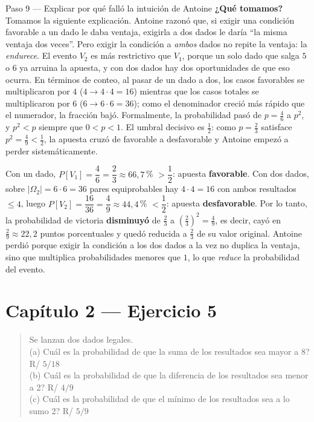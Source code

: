 \documentclass[11pt]{article}
\begin{document}
\begin{sol}
\begin{paso}{Paso 9 --- Explicar por qué falló la intuición de Antoine}
\textbf{¿Qué tomamos?} Tomamos la siguiente explicación. Antoine razonó que, si exigir una
condición favorable a un dado le daba ventaja, exigirla a dos dados le daría ``la misma ventaja
dos veces''. Pero exigir la condición a \emph{ambos} dados no repite la ventaja: la
\emph{endurece}. El evento $V_2$ es más restrictivo que $V_1$, porque un solo dado que salga $5$
o $6$ ya arruina la apuesta, y con dos dados hay dos oportunidades de que eso ocurra. En
términos de conteo, al pasar de un dado a dos, los casos favorables se multiplicaron por $4$
($4\to 4\cdot 4=16$) mientras que los casos totales se multiplicaron por $6$
($6\to 6\cdot 6=36$); como el denominador creció más rápido que el numerador, la fracción bajó.
Formalmente, la probabilidad pasó de $p=\frac46$ a $p^{2}$, y $p^{2}<p$ siempre que $0<p<1$. El
umbral decisivo es $\tfrac12$: como $p=\frac23$ satisface $p^{2}=\frac49<\frac12$, la apuesta
cruzó de favorable a desfavorable y Antoine empezó a perder sistemáticamente.
\end{paso}

\end{sol}

\begin{resp}
Con un dado, $P[V_1]=\dfrac{4}{6}=\dfrac{2}{3}\approx 66{,}7$\,\% $>\dfrac12$: apuesta
\textbf{favorable}. Con dos dados, sobre $|\Omega_2|=6\cdot 6=36$ pares equiprobables hay
$4\cdot 4=16$ con ambos resultados $\le 4$, luego
$P[V_2]=\dfrac{16}{36}=\dfrac{4}{9}\approx 44{,}4$\,\% $<\dfrac12$: apuesta \textbf{desfavorable}.
Por lo tanto, la probabilidad de victoria \textbf{disminuyó} de $\frac23$ a
$\left(\frac23\right)^{2}=\frac49$, es decir, cayó en $\frac{2}{9}\approx 22{,}2$ puntos
porcentuales y quedó reducida a $\frac23$ de su valor original. Antoine perdió porque exigir la
condición a los dos dados a la vez no duplica la ventaja, sino que multiplica probabilidades
menores que $1$, lo que \emph{reduce} la probabilidad del evento.
\end{resp}

\section*{Capítulo 2 --- Ejercicio 5}

\begin{quote}
Se lanzan dos dados legales.\\
(a) Cuál es la probabilidad de que la suma de los resultados sea mayor a 8? \hfill R/ $5/18$\\
(b) Cuál es la probabilidad de que la diferencia de los resultados sea menor a 2? \hfill R/ $4/9$\\
(c) Cuál es la probabilidad de que el mínimo de los resultados sea a lo sumo 2? \hfill R/ $5/9$
\end{quote}
\end{document}
